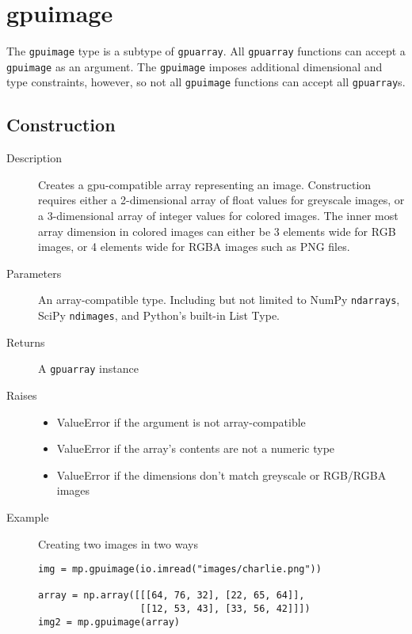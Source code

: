 
\section{gpuimage}

The \verb|gpuimage| type is a subtype of \verb|gpuarray|. All \verb|gpuarray| functions can accept a \verb|gpuimage| as an argument. The \verb|gpuimage| imposes additional dimensional and type constraints, however, so not all \verb|gpuimage| functions can accept all \verb|gpuarray|s.

\subsection{Construction}

\begin{description}
   \item[Description] Creates a gpu-compatible array representing an image. Construction requires either a 2-dimensional array of float values for greyscale images, or a 3-dimensional array of integer values for colored images. The inner most array dimension in colored images can either be 3 elements wide for RGB images, or 4 elements wide for RGBA images such as PNG files.
   \item[Parameters] An array-compatible type. Including but not limited to NumPy \verb|ndarrays|, SciPy \verb|ndimages|, and Python's built-in List Type.
   \item[Returns] A \verb|gpuarray| instance
   \item[Raises] \phantom{}
   \begin{itemize}
       \item ValueError if the argument is not array-compatible
       \item ValueError if the array's contents are not a numeric type
       \item ValueError if the dimensions don't match greyscale or RGB/RGBA images
   \end{itemize}
   \item[Example] Creating two images in two ways\phantom{}
   \begin{lstlisting}
img = mp.gpuimage(io.imread("images/charlie.png"))

array = np.array([[[64, 76, 32], [22, 65, 64]], 
                  [[12, 53, 43], [33, 56, 42]]])
img2 = mp.gpuimage(array)
\end{lstlisting}
\end{description}

